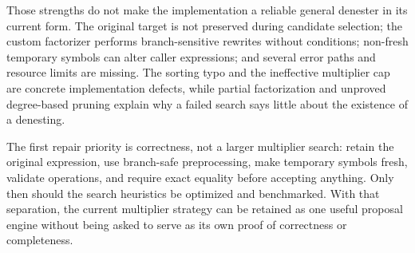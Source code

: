 \documentclass[11pt,letterpaper]{article}
\theoremstyle{definition}
\begin{document}
Those strengths do not make the implementation a reliable general denester in its
current form. The original target is not preserved during candidate selection;
the custom factorizer performs branch-sensitive rewrites without conditions;
non-fresh temporary symbols can alter caller expressions; and several error paths
and resource limits are missing. The sorting typo and the ineffective multiplier
cap are concrete implementation defects, while partial factorization and
unproved degree-based pruning explain why a failed search says little about the
existence of a denesting.

The first repair priority is correctness, not a larger multiplier search: retain
the original expression, use branch-safe preprocessing, make temporary symbols
fresh, validate operations, and require exact equality before accepting anything.
Only then should the search heuristics be optimized and benchmarked. With that
separation, the current multiplier strategy can be retained as one useful proposal
engine without being asked to serve as its own proof of correctness or completeness.
\end{document}
